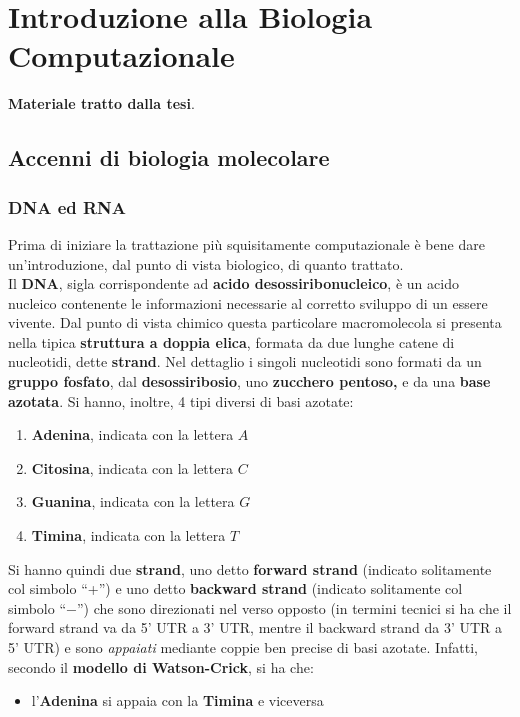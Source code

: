\documentclass[a4paper,12pt, oneside]{book}
\begin{document}
\chapter{Introduzione alla Biologia Computazionale}
\begin{shaded}
  \textbf{Materiale tratto dalla tesi}.\\
  \section{Accenni di biologia molecolare}
  \subsection{DNA ed RNA}
  Prima di iniziare la trattazione più squisitamente computazionale è bene dare
  un'introduzione, dal punto di vista biologico, di quanto trattato.\\
  Il \textbf{DNA}, sigla corrispondente ad \textbf{acido desossiribonucleico}, è
  un acido nucleico contenente le informazioni necessarie al corretto sviluppo di
  un essere vivente. Dal punto di vista chimico questa particolare macromolecola
  si presenta nella tipica \textbf{struttura a doppia elica}, formata da due
  lunghe catene di nucleotidi, dette \textbf{strand}. Nel dettaglio i singoli
  nucleotidi sono formati da un \textbf{gruppo fosfato}, dal
  \textbf{desossiribosio}, uno \textbf{zucchero pentoso,} e da una \textbf{base
  azotata}. Si hanno, inoltre, 4 tipi diversi di basi azotate:
  \begin{enumerate}
    \item \textbf{Adenina}, indicata con la lettera $A$
    \item \textbf{Citosina}, indicata con la lettera $C$
    \item \textbf{Guanina}, indicata con la lettera $G$
    \item \textbf{Timina}, indicata con la lettera $T$
  \end{enumerate}
  Si hanno quindi due \textbf{strand}, uno detto \textbf{forward
  strand} (indicato solitamente col simbolo ``+'') e uno detto \textbf{backward
  strand} (indicato solitamente col simbolo ``$-$'') che sono direzionati nel
  verso  
  opposto (in termini tecnici si ha che il forward strand va da 5' UTR a 3' UTR,
  mentre il backward strand da 3' UTR a 5' UTR) e sono \textit{appaiati} mediante
  coppie ben precise di basi azotate.
  Infatti, secondo il \textbf{modello di Watson-Crick}, si
  ha che:  
  \begin{itemize}
    \item l'\textbf{Adenina} si appaia con la \textbf{Timina} e viceversa

\end{itemize}
\end{shaded}
\end{document}
